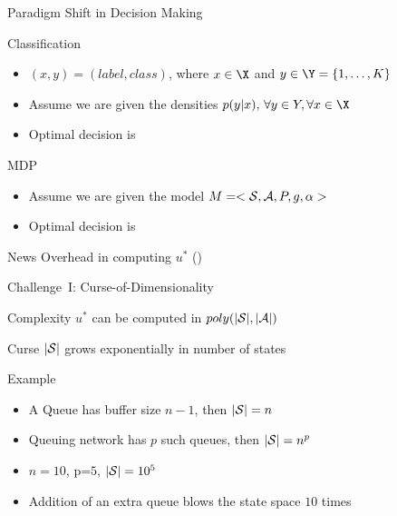 \documentclass[10pt,handout]{beamer}
\begin{document}
\begin{frame}[fragile]{Paradigm Shift in Decision Making}
\begin{block}{Classification}
\begin{itemize}
\item $(x,y)=(label,class)$, where $x\in \X$ and $y\in \Y=\{1,\ldots,K\}$
\item Assume we are given the densities $p(y|x),\,\forall y\in Y,\forall x\in \X$
\item Optimal decision is {}
\end{itemize}
\end{block}

\begin{block}{MDP}
\begin{itemize}
\item Assume we are given the model $M=<\S,\A,P,g,\alpha>$
\item Optimal decision is {}
\end{itemize}
\end{block}

\begin{block}{News}
\centering
Overhead in computing $u^*$ ({\color{orange}{We are not lucky here}})
\end{block}

\end{frame}


\begin{frame}[fragile]{Challenge~I: {Curse-of-Dimensionality}}
\begin{block}{Complexity \cite{littman1995complexity}}
 $u^*$ can be computed in $poly(|\S|,|\A|)$
\end{block}

\begin{block}{Curse}
$|\S|$ grows exponentially in number of states
\end{block}
\begin{block}{Example}
\begin{itemize}
\item A Queue has buffer size $n-1$, then $|\S|=n$
\item Queuing network has $p$ such queues, then $|\S|=n^p$
\item $n=10$, p=$5$, $|\S|=10^5$
\item Addition of an extra queue blows the state space $10$ times
\end{itemize}
\end{block}
\end{frame}
\end{document}
